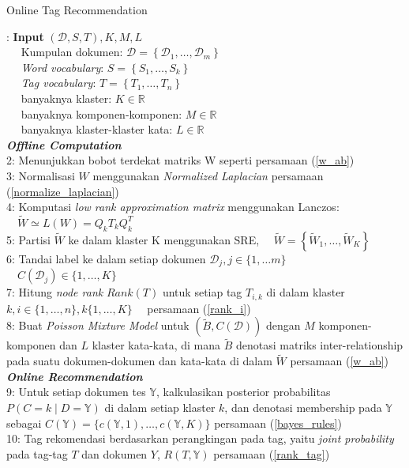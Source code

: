 \begin{algorithm} [H]
\caption{Online Tag Recommendation \citep*{song2008autotag}}\label{alg:online_tag_recommendation}
\begin{algorithmic}
: \textbf{Input} $(\mathcal{D}, S, T), K, M, L$ \\
$\quad$ Kumpulan dokumen: $\mathcal{D}=\left\{\mathcal{D}_{1}, \ldots, \mathcal{D}_{m}\right\}$ \\
$\quad$ \textit{Word vocabulary}: $S=\left\{S_{1}, \ldots, S_{k}\right\}$ \\
$\quad$ \textit{Tag vocabulary}: $T=\left\{T_{1}, \ldots, T_{n}\right\}$ \\
$\quad$ banyaknya klaster: $K \in \mathbb{R}$ \\
$\quad$ banyaknya komponen-komponen: $M \in \mathbb{R}$ \\
$\quad$ banyaknya klaster-klaster kata: $ L \in \mathbb{R} $ \\
\textit{\textbf{Offline Computation}} \\
2: Menunjukkan bobot terdekat matriks W seperti persamaan (\ref{w_ab}) \\
3: Normalisasi $W$ menggunakan \textit{Normalized Laplacian} persamaan (\ref{normalize_laplacian}) \\
4: Komputasi \textit{low rank approximation matrix} menggunakan Lanczos: \\
$\quad \tilde{W} \simeq L(W)=Q_{k} T_{k} Q_{k}^{T}$ \\
5: Partisi $\tilde{W}$ ke dalam klaster K menggunakan SRE, 
$\quad \tilde{W}=\left\{\tilde{W}_{1}, \ldots, \tilde{W}_{K}\right\}$ \\
6: Tandai label ke dalam setiap dokumen $\mathcal{D}_{j}, j \in\{1, \ldots m\}$ \\
$\quad C\left(\mathcal{D}_{j}\right) \in\{1, \ldots, K\}$ \\
7: Hitung \textit{node rank} $Rank(T)$ untuk setiap tag $T_{i, k}$ di dalam klaster \\
$k, i \in\{1, \ldots, n\}, k\{1, \ldots, K\} \quad$ persamaan (\ref{rank_i}) \\
8: Buat \textit{Poisson Mixture Model} untuk $(\tilde{B}, C(\mathcal{D}))$ dengan $M$ komponen-komponen dan $L$ klaster kata-kata, di mana $\tilde{B}$ denotasi matriks inter-relationship pada suatu dokumen-dokumen dan kata-kata di dalam $\tilde{W}$ persamaan (\ref{w_ab})\\
\textit{\textbf{Online Recommendation}} \\
9: Untuk setiap dokumen tes $\mathbb{Y}$, kalkulasikan posterior probabilitas \\
$P(C=k \mid D=\mathbb{Y})$ di dalam setiap klaster $k$, dan denotasi membership pada $\mathbb{Y}$ sebagai $C(\mathbb{Y})=\{c(\mathbb{Y}, 1), \ldots, c(\mathbb{Y}, K)\}$ persamaan (\ref{bayes_rules}) \\
10: Tag rekomendasi berdasarkan perangkingan pada tag, yaitu \textit{joint probability} pada tag-tag $T$ dan dokumen $Y$, $R(T, \mathbb{Y})$ persamaan (\ref{rank_tag}) \\
\end{algorithmic}
\end{algorithm}

